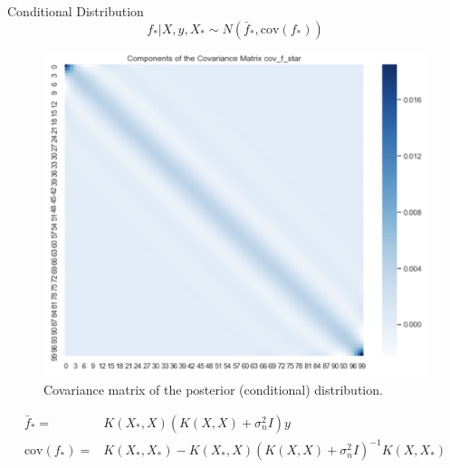 \documentclass[10pt]{beamer}
\begin{document}
\begin{frame}{Conditional Distribution}
 $$f_* | X, y, X_*\sim N(\bar{f}_*, \text{cov}(f_*))$$
\begin{center}
\begin{figure}
\includegraphics[scale=0.24]{images/cov_posterior_example2.png} 
\caption{Covariance matrix of the posterior (conditional) distribution.}
\end{figure}
\end{center}
 \begin{align*}
\bar{f}_* =& K(X_*,X)(K(X,X) + \sigma_n^2 I)y \\
\text{cov}(f_*) =& K(X_*,X_*) - K(X_*,X)(K(X,X) + \sigma_n^2I)^{-1}K(X,X_*)
\end{align*}
\end{frame}
\end{document}
